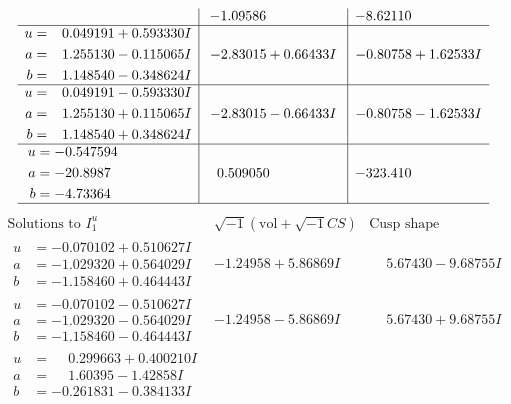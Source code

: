 \documentclass[1p]{elsarticle_modified}
\theoremstyle{definition}
\newcommand{\I}{\sqrt{-1}}
\begin{document}
$$\begin{array}{c|c|c}
 & -1.09586\phantom{ +0.000000I} & -8.62110\phantom{ +0.000000I} \\ \hline\begin{aligned}
u &= \phantom{-}0.049191 + 0.593330 I \\
a &= \phantom{-}1.255130 - 0.115065 I \\
b &= \phantom{-}1.148540 - 0.348624 I\end{aligned}
 & -2.83015 + 0.66433 I & -0.80758 + 1.62533 I \\ \hline\begin{aligned}
u &= \phantom{-}0.049191 - 0.593330 I \\
a &= \phantom{-}1.255130 + 0.115065 I \\
b &= \phantom{-}1.148540 + 0.348624 I\end{aligned}
 & -2.83015 - 0.66433 I & -0.80758 - 1.62533 I \\ \hline\begin{aligned}
u &= -0.547594\phantom{ +0.000000I} \\
a &= -20.8987\phantom{ +0.000000I} \\
b &= -4.73364\phantom{ +0.000000I}\end{aligned}
 & \phantom{-}0.509050\phantom{ +0.000000I} & -323.410\phantom{ +0.000000I}\\
 \hline 
 \end{array}$$\newpage$$\begin{array}{c|c|c}  
\text{Solutions to }I^u_{1}& \I (\text{vol} + \sqrt{-1}CS) & \text{Cusp shape}\\
 \hline 
\begin{aligned}
u &= -0.070102 + 0.510627 I \\
a &= -1.029320 + 0.564029 I \\
b &= -1.158460 + 0.464443 I\end{aligned}
 & -1.24958 + 5.86869 I & \phantom{-}5.67430 - 9.68755 I \\ \hline\begin{aligned}
u &= -0.070102 - 0.510627 I \\
a &= -1.029320 - 0.564029 I \\
b &= -1.158460 - 0.464443 I\end{aligned}
 & -1.24958 - 5.86869 I & \phantom{-}5.67430 + 9.68755 I \\ \hline\begin{aligned}
u &= \phantom{-}0.299663 + 0.400210 I \\
a &= \phantom{-}1.60395 - 1.42858 I \\
b &= -0.261831 - 0.384133 I\end{aligned}

\end{array}$$
\end{document}
